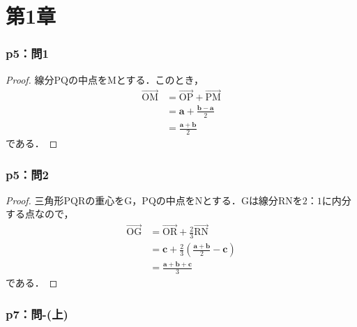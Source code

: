 \documentclass[a4paper,10pt,fleqn]{ltjsarticle}
\begin{document}
\newpage
\part*{第1章}

\section*{p5：問1}

\begin{tleftbar}
  \begin{proof}
    線分$\mathrm{PQ}$の中点を$\mathrm{M}$とする．このとき，
    \begin{align*}
      \overrightarrow{\mathrm{OM}} & = \overrightarrow{\mathrm{OP}} + \overrightarrow{\mathrm{PM}} \\
                                   & = \bm{a} + \frac{\bm{b}-\bm{a}}{2}                            \\
                                   & = \frac{\bm{a}+\bm{b}}{2}
    \end{align*}
    である．
  \end{proof}
\end{tleftbar}
\section*{p5：問2}
\begin{tleftbar}
  \begin{proof}
    三角形$\mathrm{PQR}$の重心を$\mathrm{G}$，$\mathrm{PQ}$の中点を$\mathrm{N}$とする．$\mathrm{G}$は線分$\mathrm{RN}$を$2：1$に内分する点なので，
    \begin{align*}
      \overrightarrow{\mathrm{OG}} & = \overrightarrow{\mathrm{OR}} + \frac{2}{3} \overrightarrow{\mathrm{RN}} \\
                                   & = \bm{c}+ \frac{2}{3} \left (\frac{\bm{a}+\bm{b}}{2}-\bm{c} \right)       \\
                                   & = \frac{\bm{a}+\bm{b}+\bm{c}}{3}
    \end{align*}
    である．
  \end{proof}
\end{tleftbar}

\newpage

\section*{p7：問-(上)}
\end{document}
